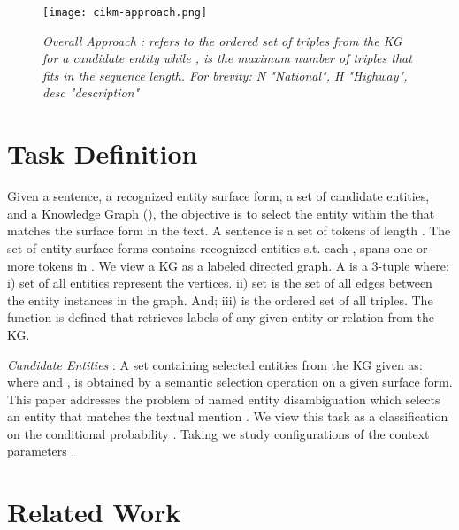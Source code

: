 \documentclass[sigconf, superscriptaddress]{acmart}
\begin{document}
\begin{figure*}[h!]
\centering
\texttt{[image: cikm-approach.png]}
\vspace{-2mm}
\caption{\textit{Overall Approach :  refers to the ordered set of triples from the KG for a candidate entity while , is the maximum number of triples that fits in the sequence length. For brevity: N \textrightarrow{} "National", H \textrightarrow{} "Highway", desc \textrightarrow {} "description"}}
\label{fig:approach}
\vspace{-2mm}
\end{figure*}
 
\vspace{-2mm}
\section{Task Definition}\label{sect:problem}
Given a sentence, a recognized entity surface form, a set of candidate entities, and a Knowledge Graph (), the objective is to select the entity within the  that matches the surface form in the text. A sentence  is a set of tokens of length . The set of entity surface forms  contains recognized entities s.t. each , spans one or more tokens in . We view a KG as a labeled directed graph. A  is a 3-tuple where: i) set  of all entities represent the vertices. ii) set  is the set of all edges between the entity instances in the graph. And; iii)  is the ordered set of all triples.
\noindent
\noindent
The function  is defined that retrieves labels of any given entity or relation from the KG. 



\textit{Candidate Entities} : A set containing selected entities from the KG given as:    where  and  , is obtained by a semantic selection operation  on a given surface form. This paper addresses the problem of named entity disambiguation which selects an entity  that matches the textual mention  . We view this task as a classification  on the conditional probability . Taking  we study configurations of the context parameters . 
\section{Related Work}
\label{sect:related-work}
\end{document}

